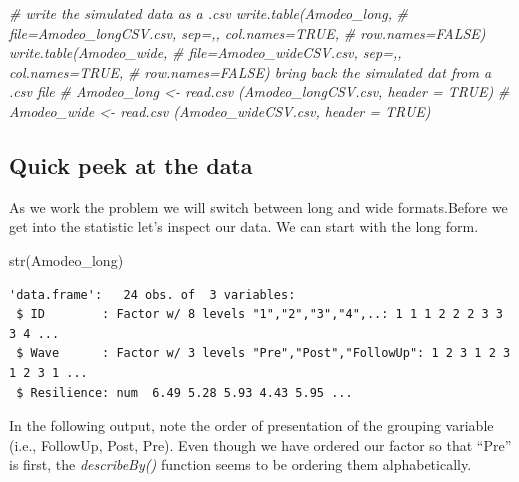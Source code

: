 \documentclass[
  11pt,
]{book}
\newenvironment{Shaded}{\begin{snugshade}}{\end{snugshade}}
\newcommand{\AttributeTok}[1]{\textcolor[rgb]{0.77,0.63,0.00}{#1}}
\newcommand{\CommentTok}[1]{\textcolor[rgb]{0.56,0.35,0.01}{\textit{#1}}}
\newcommand{\ConstantTok}[1]{\textcolor[rgb]{0.00,0.00,0.00}{#1}}
\newcommand{\DecValTok}[1]{\textcolor[rgb]{0.00,0.00,0.81}{#1}}
\newcommand{\FunctionTok}[1]{\textcolor[rgb]{0.00,0.00,0.00}{#1}}
\newcommand{\NormalTok}[1]{#1}
\newcommand{\SpecialCharTok}[1]{\textcolor[rgb]{0.00,0.00,0.00}{#1}}
\begin{document}
\begin{Shaded}
\begin{Highlighting}[]
\CommentTok{\# write the simulated data as a .csv write.table(Amodeo\_long,}
\CommentTok{\# file=\textquotesingle{}Amodeo\_longCSV.csv\textquotesingle{}, sep=\textquotesingle{},\textquotesingle{}, col.names=TRUE,}
\CommentTok{\# row.names=FALSE) write.table(Amodeo\_wide,}
\CommentTok{\# file=\textquotesingle{}Amodeo\_wideCSV.csv\textquotesingle{}, sep=\textquotesingle{},\textquotesingle{}, col.names=TRUE,}
\CommentTok{\# row.names=FALSE) bring back the simulated dat from a .csv file}
\CommentTok{\# Amodeo\_long \textless{}{-} read.csv (\textquotesingle{}Amodeo\_longCSV.csv\textquotesingle{}, header = TRUE)}
\CommentTok{\# Amodeo\_wide \textless{}{-} read.csv (\textquotesingle{}Amodeo\_wideCSV.csv\textquotesingle{}, header = TRUE)}
\end{Highlighting}
\end{Shaded}

\hypertarget{quick-peek-at-the-data}{%
\subsection{Quick peek at the data}\label{quick-peek-at-the-data}}

As we work the problem we will switch between long and wide formats.Before we get into the statistic let's inspect our data. We can start with the long form.

\begin{Shaded}
\begin{Highlighting}[]
\FunctionTok{str}\NormalTok{(Amodeo\_long)}
\end{Highlighting}
\end{Shaded}

\begin{verbatim}
'data.frame':   24 obs. of  3 variables:
 $ ID        : Factor w/ 8 levels "1","2","3","4",..: 1 1 1 2 2 2 3 3 3 4 ...
 $ Wave      : Factor w/ 3 levels "Pre","Post","FollowUp": 1 2 3 1 2 3 1 2 3 1 ...
 $ Resilience: num  6.49 5.28 5.93 4.43 5.95 ...
\end{verbatim}

In the following output, note the order of presentation of the grouping variable (i.e., FollowUp, Post, Pre). Even though we have ordered our factor so that ``Pre'' is first, the \emph{describeBy()} function seems to be ordering them alphabetically.

\begin{Shaded}
\end{Shaded}
\end{document}
